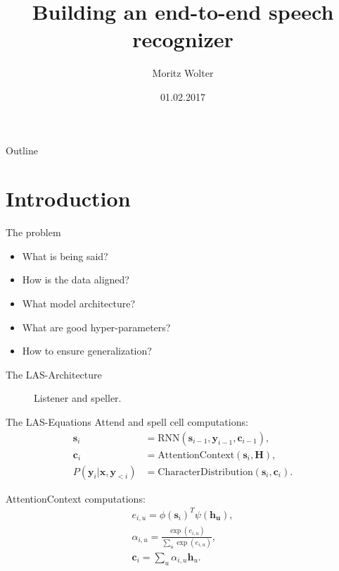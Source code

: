 \documentclass{beamer}
\title{Building an end-to-end speech recognizer}
\author{Moritz Wolter}
\date{01.02.2017}
\begin{document}
\begin{frame}
  \titlepage
\end{frame}


\begin{frame}{Outline}
  \tableofcontents
\end{frame}

\section{Introduction}
\begin{frame}{The problem}
	\begin{itemize}
		\item What is being said?
		\item How is the data aligned?
		\item What model architecture?
		\item What are good hyper-parameters?
		\item How to ensure generalization?
	\end{itemize}
\end{frame}

\begin{frame}{The LAS-Architecture}
	\begin{figure}
		\caption{Listener and speller.}
	\end{figure}
\end{frame}

\begin{frame}{The LAS-Equations}
Attend and spell cell computations:
\begin{align}
	 \mathbf{s}_i &= \text{RNN}(\mathbf{s}_{i-1}, \mathbf{y}_{i-1}, \mathbf{c}_{i-1}), \\
	 \mathbf{c}_i &= \text{AttentionContext}(\mathbf{s}_i,\mathbf{H}), \\
	  P(\mathbf{y}_i|\mathbf{x}, \mathbf{y}_{<i}) &= \text{CharacterDistribution}(\mathbf{s}_i,\textbf{c}_i).
\end{align}

AttentionContext computations:
\begin{align}
	e_{i,u} = \phi(\mathbf{s}_i)^T \psi(\mathbf{h_u}), \\
	\alpha_{i,u} = \frac{ \exp(e_{i,u})}{ \sum\limits_{u} \exp(e_{i,u})}, \\
	\label{eq:alphas}
	\mathbf{c}_i = \sum\limits_{u} \alpha_{i,u} \mathbf{h}_u.
\end{align}
\end{frame}
\end{document}
